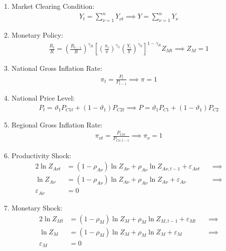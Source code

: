 \documentclass[
thesis.tex
]{subfiles}
\begin{document}
\begin{enumerate}
	\item Market Clearing Condition:
	\begin{align}
		Y_t = \sum_{\nu=1}^{n} Y_{\nu t} \implies Y = \sum_{\nu=1}^{n} Y_{\nu} \label{eq:reg-ss-market-clearing-condition}
	\end{align}
	
	\item Monetary Policy:
	\begin{align}
		\label{eq:reg-ss-monetary-policy}
		\frac{R_t}{R} =
		\left( \frac{R_{t-1}}{R} \right)^{\gamma_R}  \left[
		\left( \frac{\pi_t}{\pi} \right)^{\gamma_\pi}
		\left( \frac{Y_t}{Y} \right)^{\gamma_Y} \right]^{1-\gamma_R} Z_{Mt}
		\implies Z_{M} = 1
	\end{align}
	
	
	\item National Gross Inflation Rate:
	\begin{align}
		\pi_t = \frac{P_t}{P_{t-1}} \implies \pi = 1 \label{eq:reg-ss-gross-inflation-rate}
	\end{align}
	
	\item National Price Level:
	\begin{align}
		P_t = \vartheta_1 P_{C1 t} + (1 -\vartheta_1) P_{C2 t} \implies P = \vartheta_1 P_{C1} + (1 -\vartheta_1) P_{C2} \label{eq:ss-national-price-level}
	\end{align}
	
	\item Regional Gross Inflation Rate:
	\begin{align}
		\pi_{\nu t} = \frac{P_{C\nu t}}{P_{C\nu, t-1}} \implies \pi_{\nu} = 1 \label{eq:ss-regional-inflation}
	\end{align}
	
	
	\item Productivity Shock:
	\begin{alignat}{2}
		\ln{Z_{A\nu t}} &= (1 -\rho_{A\nu}) \ln{Z_{A\nu}} + \rho_{A\nu} \ln{Z_{A\nu,t-1}} + \varepsilon_{A\nu t} \quad &\implies \nonumber \\
		\ln{Z_{A\nu}} &= (1 -\rho_{A\nu}) \ln{Z_{A\nu}} + \rho_{A\nu} \ln{Z_{A\nu}} + \varepsilon_{A\nu} &\implies \nonumber \\
		\varepsilon_{A\nu} &= 0 \label{eq:reg-ss-productivity-shock}
	\end{alignat}
	
	\item Monetary Shock:
	\begin{alignat}{2}
		\ln{Z_{Mt}} &= (1-\rho_M)\ln{Z_{M}} + \rho_M\ln{Z_{M,t-1}} + \varepsilon_{Mt} \quad &\implies \nonumber \\
		\ln{Z_{M}} &= (1-\rho_M)\ln{Z_{M}} + \rho_M\ln{Z_{M}} + \varepsilon_{M} &\implies \nonumber \\
		\varepsilon_{M} &= 0 \label{eq:reg-ss-monetary-shock}
	\end{alignat}
	
\end{enumerate}
\end{document}
